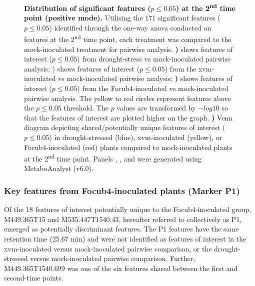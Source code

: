 \begin{figure}[hp!]
\begin{subfigure}[b]{0.47\textwidth}
    \caption{}
    \label{fig:PairwiseVenn-SecondTimePoint}
  \end{subfigure}
  \caption[Distribution of significant features at the 2\textsuperscript{nd} time point (positive mode).]{\textbf{Distribution of significant features ($p \le0.05$) at the 2\textsuperscript{nd} time point (positive mode).}
  Utilising the 171 significant features ($p \le0.05$) identified through the one-way \ac{anova} conducted on features at the 2\textsuperscript{nd} time point, each treatment was compared to the mock-inoculated treatment for pairwise analysis.
  \textbf{)} shows features of interest ($p \le0.05$) from drought-stress vs mock-inoculated pairwise analysis;
  \textbf{}) shows features of interest ($p \le0.05$) from the \acl{xvm}-inoculated vs mock-inoculated pairwise analysis; 
  \textbf{)} shows features of interest ($p \le0.05$) from the \acl{Focub4}-inoculated vs mock-inoculated pairwise analysis. The yellow to red circles represent features above the $p \le0.05$ threshold. The $p$ values are transformed by $-log10$ so that the features of interest are plotted higher on the graph.
  \textbf{)} Venn diagram depicting shared/potentially unique features of interest ($p \le0.05$) in drought-stressed (blue), \ac{xvm}-inoculated (yellow), or \ac{Focub4}-inoculated (red) plants compared to mock-inoculated plants at the 2\textsuperscript{nd} time point. 
  Panels , , and  were generated using MetaboAnalyst (v6.0). 
  }
  \label{fig:enter-label}
\end{figure}

\subsubsection{Key features from \acl{Focub4}-inoculated plants (Marker P1)}

Of the 18 features of interest potentially unique to the \ac{Focub4}-inoculated group, M449.365T15 and M535.447T1540.43, hereafter referred to collectively as P1, emerged as potentially discriminant features. The P1 features have the same retention time (25.67 min) and were not identified as features of interest in the \ac{xvm}-inoculated versus mock-inoculated pairwise comparison, or the drought-stressed versus mock-inoculated pairwise comparison. Further, M449.365T1540.699 was one of the six features shared between the first and second-time points. 


